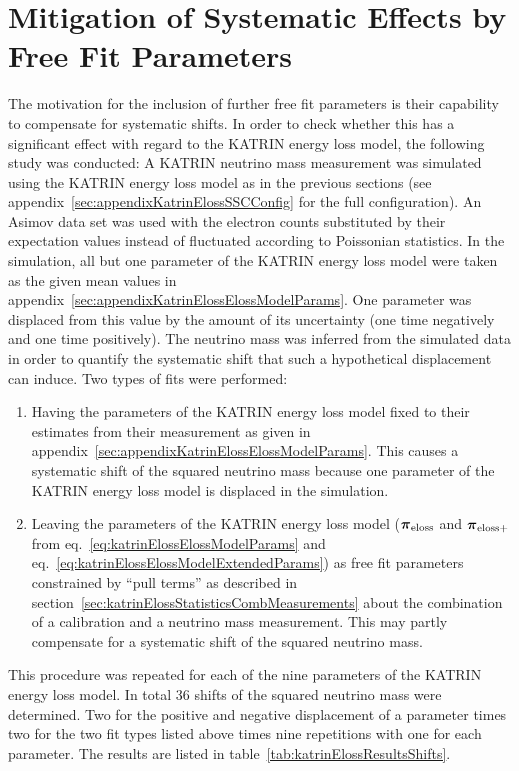 \section{Mitigation of Systematic Effects by Free Fit Parameters}
The motivation for the inclusion of further free fit parameters is their capability to compensate for systematic shifts. In order to check whether this has a significant effect with regard to the KATRIN energy loss model, the following study was conducted: A KATRIN neutrino mass measurement was simulated using the KATRIN energy loss model as in the previous sections (see appendix~\ref{sec:appendixKatrinElossSSCConfig} for the full configuration). An Asimov data set was used with the electron counts substituted by their expectation values instead of fluctuated according to Poissonian statistics. In the simulation, all but one parameter of the KATRIN energy loss model were taken as the given mean values in appendix~\ref{sec:appendixKatrinElossElossModelParams}. One parameter was displaced from this value by the amount of its uncertainty (one time negatively and one time positively). The neutrino mass was inferred from the simulated data in order to quantify the systematic shift that such a hypothetical displacement can induce. Two types of fits were performed:
\begin{enumerate}
	\item Having the parameters of the KATRIN energy loss model fixed to their estimates from their measurement as given in appendix~\ref{sec:appendixKatrinElossElossModelParams}. This causes a systematic shift of the squared neutrino mass because one parameter of the KATRIN energy loss model is displaced in the simulation.
	
	\item Leaving the parameters of the KATRIN energy loss model ($\boldsymbol{\mathbf{\pi}}_\mathrm{eloss}$ and $\boldsymbol{\mathbf{\pi}}_\mathrm{eloss+}$ from eq.~\eqref{eq:katrinElossElossModelParams} and eq.~\eqref{eq:katrinElossElossModelExtendedParams}) as free fit parameters constrained by ``pull terms'' as described in section~\ref{sec:katrinElossStatisticsCombMeasurements} about the combination of a calibration and a neutrino mass measurement. This may partly compensate for a systematic shift of the squared neutrino mass.
	\end{enumerate}
This procedure was repeated for each of the nine parameters of the KATRIN energy loss model. In total 36 shifts of the squared neutrino mass were determined. Two for the positive and negative displacement of a parameter times two for the two fit types listed above times nine repetitions with one for each parameter. The results are listed in table~\ref{tab:katrinElossResultsShifts}. 

